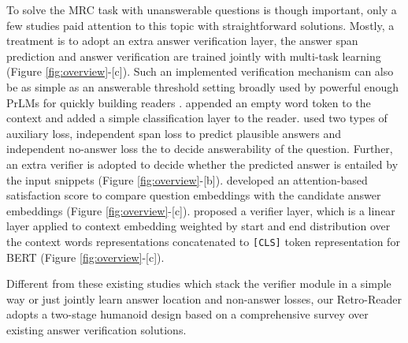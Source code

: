 \documentclass[letterpaper]{article} %
\begin{document}
To solve the MRC task with unanswerable questions is though important, only a few studies paid attention to this topic with straightforward solutions.
Mostly, a treatment is to adopt an extra answer verification layer, the answer span prediction and answer verification are trained jointly with multi-task learning (Figure \ref{fig:overview}-[c]). Such an implemented verification mechanism can also be as simple as an answerable threshold setting broadly used by powerful enough PrLMs for quickly building readers \cite{devlin2018bert,zhang2019semantics}.
\citeauthor{liu2018stochastic}  appended an empty word token to the context and added a simple classification layer to the reader. %
\citeauthor{hu2019read}  used two types of auxiliary loss, independent span loss to predict plausible answers and independent no-answer loss the to decide answerability of the question. Further, an extra verifier is adopted to decide whether the predicted answer is entailed by the input snippets (Figure \ref{fig:overview}-[b]). 
\citeauthor{back2020neurquri}  developed an attention-based satisfaction score to compare question embeddings with the candidate answer embeddings (Figure \ref{fig:overview}-[c]). %
\citeauthor{zhang2019sg}  proposed a verifier layer, which is 
a linear layer applied to context embedding weighted by start and end distribution over the context words representations concatenated to \texttt{[CLS]} token representation for BERT (Figure \ref{fig:overview}-[c]). 


Different from these existing studies which stack the verifier module in a simple way or just jointly learn answer location and non-answer losses, our Retro-Reader adopts a two-stage humanoid design \cite{DBLP:conf/sigir/ZhengMLYZM19,doi:10.1080/00461520.1987.9653053} based on a comprehensive survey over existing answer verification solutions.
\end{document}
